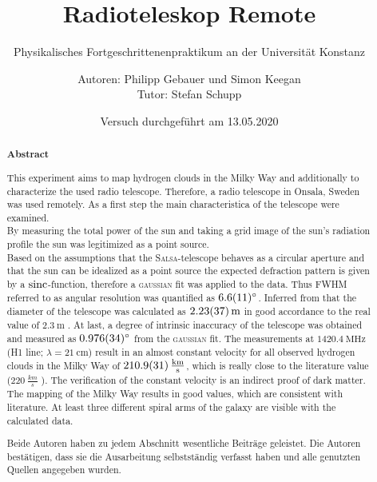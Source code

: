 \title{ Radioteleskop Remote}
\subtitle{Physikalisches Fortgeschrittenenpraktikum an der Universität Konstanz}
\author{Autoren: Philipp Gebauer und Simon Keegan \\ \large{Tutor: Stefan Schupp}}
\date{Versuch durchgeführt am 13.05.2020}
\maketitle
\begin{abstract}
    \begin{center}
        \Large{\textsf{\textbf{Abstract}}}
    \end{center}
    \vspace{0.75 cm}
    \begin{singlespace}
    \noindent This experiment aims to map hydrogen clouds in the Milky Way and additionally to characterize the used radio telescope.
    Therefore, a radio telescope in Onsala, Sweden was used remotely.
    As a first step the main characteristica of the telescope were examined.\\
    By measuring the total power of the sun and taking a grid image of the sun's radiation profile the sun was legitimized as a point source. \\
    Based on the assumptions that the \textsc{Salsa}-telescope behaves as a circular aperture and that the sun can be idealized as a point source the expected defraction pattern is given by a $\operatorname{sinc}$-function, therefore a \textsc{gaussian} fit was applied to the data.
    Thus FWHM referred to as angular resolution was quantified as $\SI{6.6 \pm 1.1}{\degree}$.
    Inferred from that the diameter of the telescope was calculated as $\SI{2.23 \pm 0.37}{\metre}$ in good accordance to the real value of $\SI{2.3}{\metre}$ \cite{Usermanual}.
    At last, a degree of intrinsic inaccuracy of the telescope was obtained and measured as $\SI{0.976 \pm 0.034}{\degree}$ from the \textsc{gaussian} fit.\newline
    The measurements at $\SI{1420.4}{\mega \hertz}$ (H1 line; $\lambda = \SI{21}{\centi \metre}$) result in an almost constant velocity for all observed hydrogen clouds in the Milky Way of $\SI{210.9 \pm 3.1}{\frac{km}{s}}$, which is really close to the literature value ($\SI{220}{\frac{km}{s}}$ \cite{LSR}).
    The verification of the constant velocity is an indirect proof of dark matter.\newline
    The mapping of the Milky Way results in good values, which are consistent with literature. 
    At least three different spiral arms of the galaxy are visible with the calculated data.
    \vspace{0.75 cm}
     
    \noindent Beide Autoren haben zu jedem Abschnitt wesentliche Beiträge geleistet. Die Autoren bestätigen, dass sie die Ausarbeitung selbstständig verfasst haben und alle genutzten Quellen angegeben wurden.

\end{singlespace}
\end{abstract}

\thispagestyle{empty}
\newpage